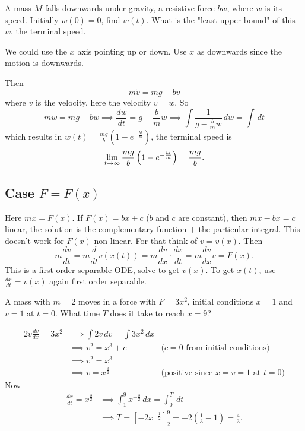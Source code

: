 \documentclass[10pt, a4paper]{article}
\begin{document}
\begin{example}
    A mass $M$ falls downwards under gravity,
    a resistive force $bw$,
    where $w$ is its speed.
    Initially $w(0) = 0$,
    find $w(t)$.
    What is the "least upper bound" of this $w$,
    the terminal speed.

    \begin{solution}
        We could use the $x$ axis pointing up or down.
        Use $x$ as downwards since the motion is downwards.

        Then
        \[
        m\dot{v} = mg - bv
        \]
        where $v$ is the velocity,
        here the velocity $v = w$.
        So
        \[
        m\dot{w} = mg - bw \implies \frac{dw}{dt} = g - \frac{b}{m}w \implies \int\frac{1}{g - \frac{b}{m}w}\,dw = \int\,dt
        \]
        which results in $w(t) = \frac{mg}{b}\left(1 - e ^ {-\frac{bt}{m}}\right)$,
        the terminal speed is
        \[
        \liminfty[t]\frac{mg}{b}\left(1 - e ^ {-\frac{bt}{m}}\right) = \frac{mg}{b}.
        \]
    \end{solution}
\end{example}

\subsection{Case \texorpdfstring{$F = F(x)$}{}}
Here $m\ddot{x} = F(x)$.
If $F(x) = bx + c$
($b$ and $c$ are constant),
then $m\ddot{x} - bx = c$ linear,
the solution is the complementary function $+$ the particular integral.
This doesn't work for $F(x)$ non-linear.
For that think of $v = v(x)$.
Then
\[
m\frac{dv}{dt} = m\frac{d}{dt}v(x(t)) = m\frac{dv}{dx}\cdot\frac{dx}{dt} = m\frac{dv}{dx}v = F(x).
\]
This is a first order separable ODE,
solve to get $v(x)$.
To get $x(t)$,
use $\frac{dx}{dt} = v(x)$ again first order separable.

\begin{example}
    A mass with $m = 2$ moves in a force with $F = 3x ^ 2$,
    initial conditions $x = 1$ and $v = 1$ at $t = 0$.
    What time $T$ does it take to reach $x = 9$?

    \begin{solution}
        \begin{align*}
            2v\frac{dv}{dx} = 3x ^ 2 &\implies \int 2v\,dv = \int 3x ^ 2\,dx \\
            &\implies v ^ 2 = x ^ 3 + c &\text{($c = 0$ from initial conditions)} \\
            &\implies v ^ 2 = x ^ 3 \\
            &\implies v = x ^ {\frac{3}{2}} &\text{(positive since $x = v = 1$ at $t = 0$)}
        \end{align*}
        Now
        \begin{align*}
            \frac{dx}{dt} = x ^ {\frac{3}{2}} &\implies \int_{1}^{9} x ^ {-\frac{3}{2}}\,dx = \int_{0}^{T}\,dt \\
            &\implies T = \left[-2x ^ {-\frac{1}{2}}\right]_{2}^{9} = -2\left(\frac{1}{3} - 1\right) = \frac{4}{3}.
        \end{align*}
    \end{solution}
\end{example}
\end{document}
